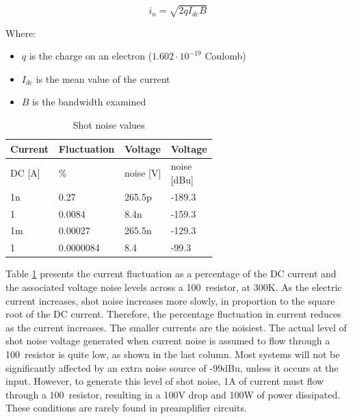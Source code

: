 \begin{equation}
    i_n = \sqrt{2qI_{dc}B}
\end{equation}

Where:
\begin{itemize}
    \item $q$ is the charge on an electron ($1.602 \cdot 10^{-19}$ Coulomb)
    \item $I_{dc}$ is the mean value of the current
    \item $B$ is the bandwidth examined
\end{itemize}

\begin{table}[h]
    \center
    \begin{tabular}{
            m{0.15\linewidth}
            m{0.15\linewidth}
            m{0.15\linewidth}
            m{0.15\linewidth}
        }
        \hline\hline
        Current & Fluctuation & Voltage & Voltage\\
        \hline\hline
        DC [A] & \% & noise [V] & noise [dBu]\\
        \hline
        1n	& 0.27	& 265.5p	& -189.3\\
        1\textmu	& 0.0084	& 8.4n	& -159.3\\
        1m	& 0.00027	& 265.5n	& -129.3\\
        1	& 0.0000084	& 8.4\textmu	& -99.3\\
        \hline\hline
    \end{tabular}
    \caption{Shot noise values}
    \label{table:Shot}
\end{table}

Table \ref{table:Shot} presents the current fluctuation as a percentage of the
DC current and the associated voltage noise levels across a 100\textOmega\
resistor, at 300K.
As the electric current increases, shot noise increases more slowly, in
proportion to the square root of the DC current. Therefore, the percentage
fluctuation in current reduces as the current increases. The smaller currents
are the noisiest. The actual level of shot noise voltage
generated when current noise is assumed to flow through a 100\textOmega\
resistor is quite low, as shown in the last column. Most systems will not be
significantly affected by an extra noise source of -99dBu, unless it occurs at
the input.
However, to generate this level of shot noise, 1A of current must flow through
a 100\textOmega\ resistor, resulting in a 100V drop and 100W of power
dissipated.
These conditions are rarely found in preamplifier circuits.

